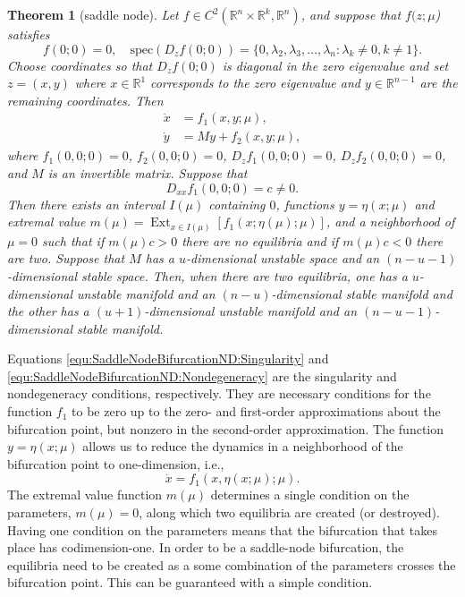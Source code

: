 \documentclass[12pt]{article}
\newtheorem{theorem}{Theorem}
\begin{document}
\begin{theorem}[saddle node]
    \label{the:SaddleNodeBifurcationND}
    Let $f\in C^2(\mathbb{R}^n\times \mathbb{R}^k,\mathbb{R}^n)$, and suppose that $f(z;\mu$) satisfies
    \begin{equation}
        f(0;0)=0, \quad \mathrm{spec}(D_z f(0;0))=\{ 0, \lambda_2, \lambda_3, \ldots, \lambda_n : \lambda_k \neq 0, k\neq 1 \}.
        \label{equ:SaddleNodeBifurcationND:Singularity}
    \end{equation}
    Choose coordinates so that $D_zf(0;0)$ is diagonal in the zero eigenvalue and set $z=(x,y)$ where $x\in \mathbb{R}^1$ corresponds to the zero eigenvalue and $y\in \mathbb{R}^{n-1}$ are the remaining coordinates. Then 
    \begin{equation}
        \begin{split}
            \dot x &= f_1(x,y;\mu), \\
            \dot y &= My + f_2(x,y;\mu),
        \end{split}
        \label{equ:SaddleNodeBifurcationND:System}
    \end{equation}
    where $f_{1}(0,0;0)=0$, $f_{2}(0,0;0)=0$, $D_z f_{1}(0,0;0)=0$, $D_z f_{2}(0,0;0)=0$, and $M$ is an invertible matrix. Suppose that 
    \begin{equation}
        D_{xx}f_1(0,0;0)=c\neq 0.
        \label{equ:SaddleNodeBifurcationND:Nondegeneracy}
    \end{equation}
    Then there exists an interval $I(\mu)$ containing $0$, functions $y=\eta(x;\mu)$ and extremal value $m(\mu)=\mathop{\mathrm{Ext}}_{x\in I(\mu)}[f_1(x;\eta(\mu);\mu)]$, and a neighborhood of $\mu=0$ such that if $m(\mu)c>0$ there are no equilibria and if $m(\mu)c<0$ there are two. Suppose that $M$ has a $u$-dimensional unstable space and an $(n-u-1)$-dimensional stable space. Then, when there are two equilibria, one has a $u$-dimensional unstable manifold and an $(n-u)$-dimensional stable manifold and the other has a $(u+1)$-dimensional unstable manifold and an $(n-u-1)$-dimensional stable manifold.
\end{theorem}

Equations \eqref{equ:SaddleNodeBifurcationND:Singularity} and \eqref{equ:SaddleNodeBifurcationND:Nondegeneracy} are the singularity and nondegeneracy conditions, respectively. They are necessary conditions for the function $f_{1}$ to be zero up to the zero- and first-order approximations about the bifurcation point, but nonzero in the second-order approximation. The function $y=\eta(x;\mu)$ allows us to reduce the dynamics in a neighborhood of the bifurcation point to one-dimension, i.e.,
\begin{equation*}
    \dot x = f_{1}(x,\eta(x;\mu);\mu).
\end{equation*}
The extremal value function $m(\mu)$ determines a single condition on the parameters, $m(\mu)=0$, along which two equilibria are created (or destroyed). Having one condition on the parameters means that the bifurcation that takes place has codimension-one. In order to be a saddle-node bifurcation, the equilibria need to be created as a some combination of the parameters crosses the bifurcation point. This can be guaranteed with a simple condition.
\end{document}
